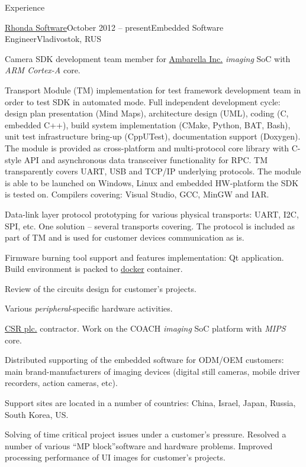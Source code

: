 \documentclass{template}
\begin{document}
\begin{rSection}{Experience}
\begin{rCompany}{\href{http://www.rhondasoftware.com}{Rhonda Software}}{October 2012 -- present}{Embedded Software Engineer}{Vladivostok, RUS}
\item Camera SDK development team member for \href{http://www.ambarella.com}{Ambarella Inc.} \textit{imaging} SoC with \textit{ARM Cortex-A} core.
\item Transport Module (TM) implementation for test framework development team in order to test SDK in automated mode. Full independent development cycle: design plan presentation (Mind Maps), architecture design (UML), coding (C, embedded C++), build system implementation (CMake, Python, BAT, Bash), unit test infrastructure bring-up (CppUTest), documentation support (Doxygen). The module is provided as cross-platform and multi-protocol core library with C-style API and asynchronous data transceiver functionality for RPC. TM transparently covers UART, USB and TCP/IP underlying protocols. The module is able to be launched on Windows, Linux and embedded HW-platform the SDK is tested on. Compilers covering: Visual Studio, GCC, MinGW and IAR.
\item Data-link layer protocol prototyping for various physical transports: UART, I2C, SPI, etc. One solution -- several transports covering. The protocol is included as part of TM and is used for customer devices communication as is.
\item Firmware burning tool support and features implementation: Qt application. Build environment is packed to \href{www.docker.com}{docker} container.
\item Review of the circuits design for customer's projects.
\item Various \textit{peripheral}-specific hardware activities. \newline
\item \href{http://www.csr.com}{CSR plc.} contractor. Work on the COACH \textit{imaging} SoC platform with \textit{MIPS} core.
\item Distributed supporting of the embedded software for ODM/OEM customers: main brand-manufacturers of imaging devices (digital still cameras, mobile driver recorders, action cameras, etc).
\item Support sites are located in a number of countries: China, Israel, Japan, Russia, South Korea, US.
\item Solving of time critical project issues under a customer's pressure. Resolved a number of various \textquotedblleft MP block\textquotedblright software and hardware problems. Improved processing performance of UI images for customer's projects.

\end{rCompany}
\end{rSection}
\end{document}
